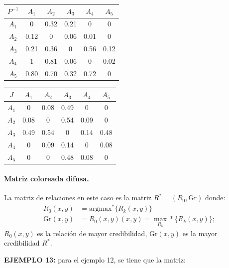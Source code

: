 \documentclass[a5paper,doc,10pt,noapacite]{apa6}
\begin{document}
{{\begin{table}[H]
   \fontsize{7}{11}\selectfont
    \begin{minipage}{.5\linewidth}
      \centering
	\begin{tabular}{c|ccccc} \thickline
	\(P^{-1}\) & \(A_1\) & \(A_2\) & \(A_3\) & \(A_4\) & \(A_5\)  \\ \hline
    \(A_1\) & 0 & 0.32 & 0.21 & 0 & 0  \\
    \(A_2\) & 0.12 & 0 & 0.06 & 0.01 & 0  \\
	\(A_3\) & 0.21 & 0.36 & 0 & 0.56 & 0.12   \\
	\(A_4\) & 1 & 0.81 & 0.06 & 0 & 0.02   \\
	\(A_5\) & 0.80 & 0.70 & 0.32 & 0.72 & 0   \\
\end{tabular}
\label{tab:B4} 
    \end{minipage}%
    \begin{minipage}{.5\linewidth}
      \centering
	\begin{tabular}{c|ccccc} \thickline
	\(J\) & \(A_1\) & \(A_2\) & \(A_3\) & \(A_4\) & \(A_5\)  \\ \hline
    \(A_1\) & 0 & 0.08 & 0.49 & 0 & 0  \\
    \(A_2\) & 0.08 & 0 & 0.54 & 0.09 & 0  \\
	\(A_3\) & 0.49 & 0.54 & 0 & 0.14 & 0.48   \\
	\(A_4\) & 0 & 0.09 & 0.14 & 0 & 0.08   \\
	\(A_5\) & 0 & 0 & 0.48 & 0.08 & 0   \\
\end{tabular}
\label{tab:B5} 
    \end{minipage} 
\end{table}

\paragraph{Matriz coloreada difusa.}

La matriz de relaciones en este caso es la matriz \(R^* = (R_0, \text{Gr})\) donde:
\begin{align*}
	R_0(x,y) &= \text{argmax}^*\{R_k(x,y)\}
\\
	\text{Gr}(x,y) &= R_0(x,y)(x,y) =\max_{R_k}*\{R_k(x,y)\};
\end{align*}
\(R_0(x,y)\) es la relación de mayor credibilidad, \(\text{Gr}(x,y)\) es la mayor credibilidad \(R^*\).

\vspace{1\baselineskip}
\textbf{EJEMPLO 13:} para el ejemplo 12, se tiene que la matriz:

}}
\end{document}
